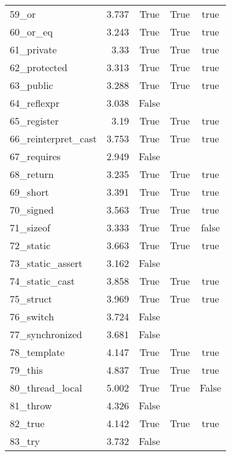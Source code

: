 \documentclass{article}
\begin{document}
\begin{longtable}{lrccc}
59\_or & 3.737& True& True& true \\[0.5ex]
60\_or\_eq & 3.243& True& True& true \\[0.5ex]
61\_private & 3.33& True& True& true \\[0.5ex]
62\_protected & 3.313& True& True& true \\[0.5ex]
63\_public & 3.288& True& True& true \\[0.5ex]
64\_reflexpr & 3.038& False \\[0.5ex]
65\_register & 3.19& True& True& true \\[0.5ex]
66\_reinterpret\_cast & 3.753& True& True& true \\[0.5ex]
67\_requires & 2.949& False \\[0.5ex]
68\_return & 3.235& True& True& true \\[0.5ex]
69\_short & 3.391& True& True& true \\[0.5ex]
70\_signed & 3.563& True& True& true \\[0.5ex]
71\_sizeof & 3.333& True& True& false \\[0.5ex]
72\_static & 3.663& True& True& true \\[0.5ex]
73\_static\_assert & 3.162& False \\[0.5ex]
74\_static\_cast & 3.858& True& True& true \\[0.5ex]
75\_struct & 3.969& True& True& true \\[0.5ex]
76\_switch & 3.724& False \\[0.5ex]
77\_synchronized & 3.681& False \\[0.5ex]
78\_template & 4.147& True& True& true \\[0.5ex]
79\_this & 4.837& True& True& true \\[0.5ex]
80\_thread\_local & 5.002& True& True& False \\[0.5ex]
81\_throw & 4.326& False \\[0.5ex]
82\_true & 4.142& True& True& true \\[0.5ex]
83\_try & 3.732& False \\[0.5ex]
\bottomrule
\end{longtable}
\end{document}
